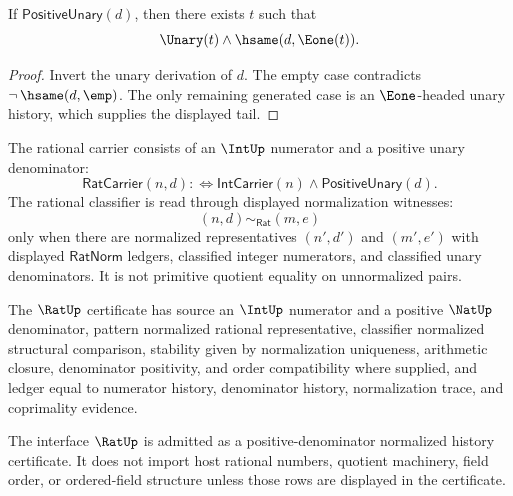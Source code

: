 \begin{theorem}
\label{thm:arithmetic-spine-positive-denominator-tail}
If $\mathsf{PositiveUnary}(d)$, then there exists $t$ such that
$$
\Unary(t)\wedge\hsame(d,\Eone(t)).
$$
\end{theorem}

\begin{proof}
Invert the unary derivation of $d$.  The empty case contradicts
$\neg\,\hsame(d,\emp)$.  The only remaining generated case is an
$\Eone$-headed unary history, which supplies the displayed tail.
\end{proof}

\begin{definition}
\label{def:arithmetic-spine-rat-carrier-classifier}
The rational carrier consists of an $\IntUp$ numerator and a positive unary
denominator:
$$
\mathsf{RatCarrier}(n,d)
:\Longleftrightarrow
\mathsf{IntCarrier}(n)\wedge\mathsf{PositiveUnary}(d).
$$
The rational classifier is read through displayed normalization witnesses:
$$
(n,d)\sim_{\mathsf{Rat}}(m,e)
$$
only when there are normalized representatives $(n',d')$ and $(m',e')$
with displayed $\mathsf{RatNorm}$ ledgers, classified integer numerators,
and classified unary denominators.  It is not primitive quotient equality
on unnormalized pairs.
\end{definition}

\begin{definition}
\label{def:arithmetic-spine-rat-namecert}
The $\RatUp$ certificate has source an $\IntUp$ numerator and a positive
$\NatUp$ denominator, pattern normalized rational representative, classifier
normalized structural comparison, stability given by normalization
uniqueness, arithmetic closure, denominator positivity, and order
compatibility where supplied, and ledger equal to numerator history,
denominator history, normalization trace, and coprimality evidence.
\end{definition}

\begin{corollary}
\label{cor:arithmetic-spine-rat-admission}
The interface $\RatUp$ is admitted as a positive-denominator normalized
history certificate.  It does not import host rational numbers, quotient
machinery, field order, or ordered-field structure unless those rows are
displayed in the certificate.
\end{corollary}

